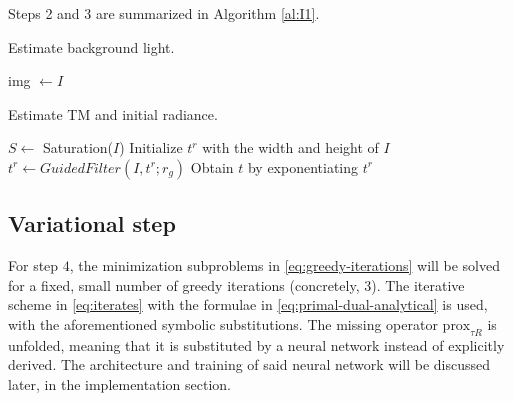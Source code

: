 \documentclass[twocolumn,twoside,a4paper,10pt]{IEEEtran}
\begin{document}
Steps 2 and 3 are summarized in Algorithm \ref{al:I1}.

\begin{algorithm}\label{al:background-light}
\caption{Estimate background light.}

img \(\gets I\)\;
\end{algorithm}
\begin{algorithm}\label{al:I1}
\caption{Estimate TM and initial radiance.}

\(S\gets \) Saturation(\(I\))\;
Initialize \(t^r\) with the width and height of \(I\)\;
\(t^r \gets GuidedFilter(I, t^r; r_g)\)\;
Obtain \(t\) by exponentiating \(t^r\)\;

\end{algorithm}
\subsection{Variational step}
For step \(4\), the minimization subproblems in \cref{eq:greedy-iterations} will be solved for a fixed, small number of greedy iterations (concretely, 3). The iterative scheme in \cref{eq:iterates} with the formulae in \cref{eq:primal-dual-analytical} is used, with the aforementioned symbolic substitutions. The missing operator \(\text{prox}_{\tau R}\) is unfolded, meaning that it is substituted by a neural network instead of explicitly derived. The architecture and training of said neural network will be discussed later, in the implementation section.
\end{document}
